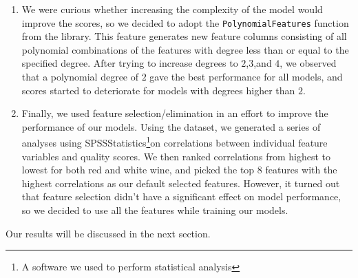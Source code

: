 \begin{enumerate}
    \item We were curious whether increasing the complexity of the model would improve the scores, so we decided to adopt the \texttt{PolynomialFeatures} function from the  library. This feature generates new feature columns consisting of all polynomial combinations of the features with degree less than or equal to the specified degree. After trying to increase degrees to $2$,$3$,and $4$, we observed that a polynomial degree of $2$ gave the best performance for all models, and scores started to deteriorate for models with degrees higher than $2$.
    \item Finally, we used feature selection/elimination in an effort to improve the performance of our models. Using the dataset, we generated a series of analyses using SPSSStatistics\footnote{A software we used to perform statistical analysis}on correlations between individual feature variables and quality scores. We then ranked correlations from highest to lowest for both red and white wine, and picked the top $8$ features with the highest correlations as our default selected features. However, it turned out that feature selection didn't have a significant effect on model performance, so we decided to use all the features while training our models.
\end{enumerate}

Our results will be discussed in the next section.
